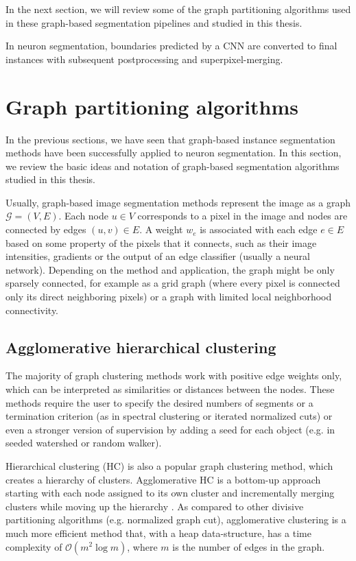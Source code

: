 In the next section, we will review some of the graph partitioning algorithms used in these graph-based segmentation pipelines and studied in this thesis.







In neuron segmentation, boundaries predicted by a CNN are converted to final instances with subsequent postprocessing and superpixel-merging.


\section{Graph partitioning algorithms}
In the previous sections, we have seen that graph-based instance segmentation methods have been successfully applied to neuron segmentation. In this section, we review the basic ideas and notation of graph-based segmentation algorithms studied in this thesis.

Usually, graph-based image segmentation methods represent the image as a graph $\mathcal{G}=(V,E)$. Each node $u\in V$ corresponds to a pixel in the image and nodes are connected by edges $(u,v)\in E$. A weight $w_e$ is associated with each edge $e \in E$ based on some property of the pixels that it connects, such as their image intensities, gradients or the output of an edge classifier (usually a neural network). Depending on the method and application, the graph might be only sparsely connected, for example as a grid graph (where every pixel is connected only its direct neighboring pixels) or a graph with limited local neighborhood connectivity.

\subsection{Agglomerative hierarchical clustering}
The majority of graph clustering methods work with positive edge weights only, which can be interpreted as similarities or distances between the nodes. These methods require the user to specify the desired numbers of segments or a termination criterion (as in spectral clustering or iterated normalized cuts) or even a stronger version of supervision by adding a seed for each object (e.g. in seeded watershed or random walker).  

Hierarchical clustering (HC) is also a popular graph clustering method, which creates a hierarchy of clusters. Agglomerative HC is a bottom-up approach starting with each node assigned to its own cluster and incrementally merging clusters while moving up the hierarchy \cite{lance1967general}. As compared to other divisive partitioning algorithms (e.g. normalized graph cut), agglomerative clustering is a much more efficient method that, with a heap data-structure, has a time complexity of $\mathcal{O}(m^2 \log m)$, where $m$ is the number of edges in the graph. 

